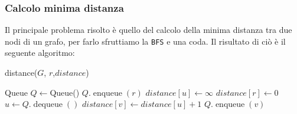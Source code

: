         \subsubsection{Calcolo minima distanza} 
            Il principale problema risolto è quello del calcolo della minima distanza tra due nodi di un grafo, per farlo sfruttiamo la \texttt{BFS} e una coda. Il risultato di ciò è il seguente algoritmo:
            \begin{algorithm}
                \caption{distance(\Graph $G$, \Node $r$,\Int[] $distance$)}
                \begin{algorithmic}
                    \State Queue $ Q \gets $Queue()
                    \State $ Q.\operatorname{enqueue}(r) $
                        \State $ distance[u] \gets \infty $
                    \EndFor
                    \State $ distance[r] \gets 0 $
                        \State \Node $ u \gets Q.\operatorname{dequeue}() $
                             
                                \State $ distance[v] \gets distance[u] + 1 $
                                \State $ Q.\operatorname{enqueue}(v) $
                            \EndIf
                        \EndFor
                    \EndWhile
                \end{algorithmic}
            \end{algorithm}

